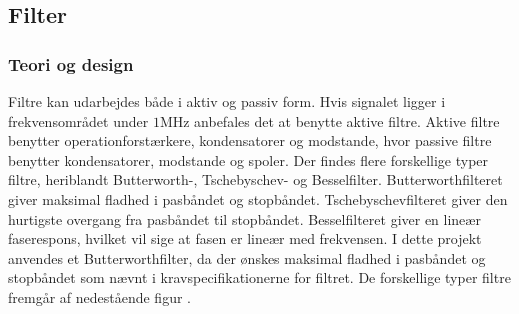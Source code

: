 \subsection{Filter}
\subsubsection{Teori og design}
Filtre kan udarbejdes både i aktiv og passiv form. Hvis signalet ligger i frekvensområdet under $1$MHz anbefales det at benytte aktive filtre. Aktive filtre benytter operationforstærkere, kondensatorer og modstande, hvor passive filtre benytter kondensatorer, modstande og spoler. \cite{Carter2013} Der findes flere forskellige typer filtre, heriblandt Butterworth-, Tschebyschev- og Besselfilter. Butterworthfilteret giver maksimal fladhed i pasbåndet og stopbåndet. Tschebyschevfilteret giver den hurtigste overgang fra pasbåndet til stopbåndet. Besselfilteret giver en lineær faserespons, hvilket vil sige at fasen er lineær med frekvensen. \cite{Carter2013} I dette projekt anvendes et Butterworthfilter, da der ønskes maksimal fladhed i pasbåndet og stopbåndet som nævnt i kravspecifikationerne for filtret. De forskellige typer filtre fremgår af nedestående figur . 

